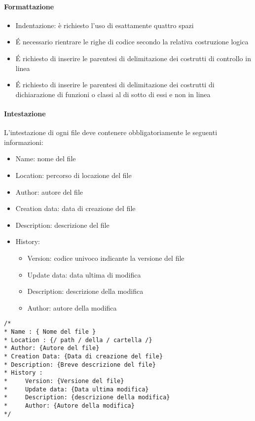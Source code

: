 \paragraph{Formattazione}
\begin{itemize}
\item Indentazione: è richiesto l'uso di esattamente quattro spazi
\item \'E necessario rientrare le righe di codice secondo la relativa costruzione  logica
\item \'E richiesto di inserire le parentesi di delimitazione dei costrutti di controllo in linea
\item \'E richiesto di inserire le parentesi di delimitazione dei costrutti di dichiarazione di funzioni o classi
  al di sotto di essi e non in linea

\end{itemize}

\paragraph{Intestazione}

L’intestazione di ogni file deve contenere obbligatoriamente le seguenti informazioni:
\begin{itemize}
\item Name: nome del file
\item Location: percorso di locazione del file
\item Author: autore del file
\item Creation data: data di creazione del file
\item Description: descrizione del file
\item History:
  \begin{itemize}
  \item Version: codice univoco indicante la versione del file
  \item Update data: data ultima di modifica
  \item Description: descrizione della modifica
  \item Author: autore della modifica
  \end{itemize}
\end{itemize}

\begin{verbatim}
/*
* Name : { Nome del file }
* Location : {/ path / della / cartella /}
* Author: {Autore del file}
* Creation Data: {Data di creazione del file}
* Description: {Breve descrizione del file}
* History :
*     Version: {Versione del file}
*     Update data: {Data ultima modifica}
*     Description: {descrizione della modifica}
*     Author: {Autore della modifica}
*/
\end{verbatim}

